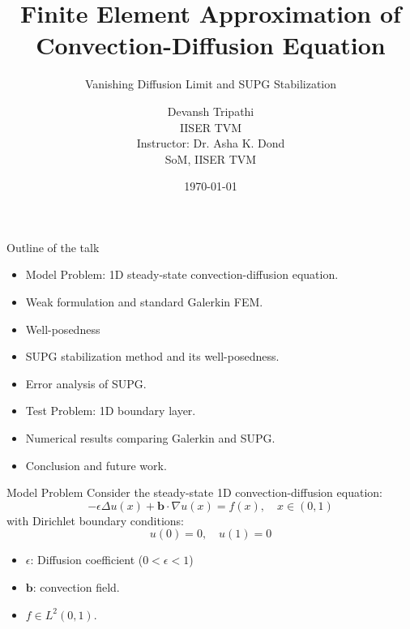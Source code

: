 \documentclass{beamer}
\title[FEM for Convection-Diffusion]{Finite Element Approximation of Convection-Diffusion Equation}
\subtitle{Vanishing Diffusion Limit and SUPG Stabilization}
\author[Devansh Tripathi]{Devansh Tripathi \\ IISER TVM \\ \vspace{1.4em} Instructor: Dr. Asha K. Dond \\ SoM, IISER TVM}
\date{\today}
\begin{document}
\begin{frame}
    \titlepage
\end{frame}

\begin{frame}{Outline of the talk}
    \begin{itemize}
        \item Model Problem: 1D steady-state convection-diffusion equation. \vspace{0.3cm}
        \item Weak formulation and standard Galerkin FEM.\vspace{0.3cm}
        \item Well-posedness \vspace{0.3cm}
        \item SUPG stabilization method and its well-posedness.\vspace{0.3cm}
        \item Error analysis of SUPG. \vspace{0.3cm}
        \item Test Problem: 1D boundary layer. \vspace{0.3cm}
        \item Numerical results comparing Galerkin and SUPG. \vspace{0.3cm}
        \item Conclusion and future work. \vspace{0.3cm}
    \end{itemize}
\end{frame}

\begin{frame}{Model Problem}
    Consider the steady-state 1D convection-diffusion equation:
    \begin{equation}
        -\epsilon \Delta u(x) + \mathbf{b}\cdot \nabla u(x) = f(x), \quad x \in (0,1)
    \end{equation}
    with Dirichlet boundary conditions:
    \begin{equation}
        u(0) = 0, \quad u(1) = 0
    \end{equation}
    \begin{itemize}
        \item $\epsilon$: Diffusion coefficient ($0 < \epsilon < 1$)
        \item $\textbf{b}$: convection field.
        \item $f \in L^2(0,1).$
    \end{itemize}
\end{frame}
\end{document}
